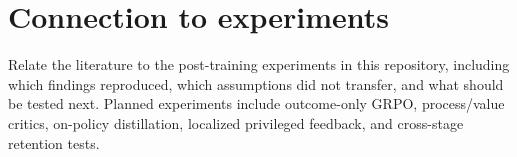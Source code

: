 \section{Connection to experiments}
Relate the literature to the post-training experiments in this repository, including
which findings reproduced, which assumptions did not transfer, and what should be tested
next. Planned experiments include outcome-only GRPO, process/value critics, on-policy
distillation, localized privileged feedback, and cross-stage retention tests.
